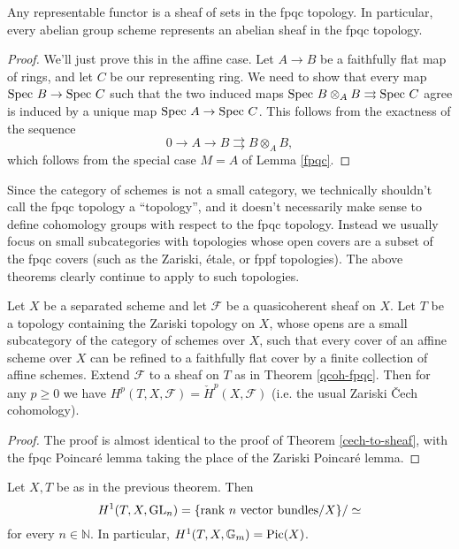 \begin{thm}\label{qcoh-fpqc} Any representable functor is a sheaf of sets in the fpqc topology. In particular, every abelian group scheme represents an abelian sheaf in the fpqc topology.
\end{thm}
\begin{proof} We'll just prove this in the affine case. Let $A\rightarrow B$ be a faithfully flat map of rings, and let $C$ be our representing ring. We need to show that every map $\mbox{\rm Spec }B\rightarrow \mbox{\rm Spec }C$ such that the two induced maps $\mbox{\rm Spec }B\otimes_AB \rightrightarrows\mbox{\rm Spec }C$ agree is induced by a unique map $\mbox{\rm Spec }A\rightarrow\mbox{\rm Spec }C$. This follows from the exactness of the sequence
\[
0 \rightarrow A \rightarrow B \rightrightarrows B\otimes_AB,
\]
which follows from the special case $M=A$ of Lemma \ref{fpqc}.
\end{proof}

\begin{rem} Since the category of schemes is not a small category, we technically shouldn't call the fpqc topology a ``topology'', and it doesn't necessarily make sense to define cohomology groups with respect to the fpqc topology. Instead we usually focus on small subcategories with topologies whose open covers are a subset of the fpqc covers (such as the Zariski, \'{e}tale, or fppf topologies). The above theorems clearly continue to apply to such topologies.
\end{rem}

\begin{thm} Let $X$ be a separated scheme and let $\mathcal{F}$ be a quasicoherent sheaf on $X$. Let $T$ be a topology containing the Zariski topology on $X$, whose opens are a small subcategory of the category of schemes over $X$, such that every cover of an affine scheme over $X$ can be refined to a faithfully flat cover by a finite collection of affine schemes. Extend $\mathcal{F}$ to a sheaf on $T$ as in Theorem \ref{qcoh-fpqc}. Then for any $p \ge 0$ we have $H^p(T,X,\mathcal{F}) = \check{H}^p(X,\mathcal{F})$ (i.e. the usual Zariski \v{C}ech cohomology).
\end{thm}
\begin{proof} The proof is almost identical to the proof of Theorem \ref{cech-to-sheaf}, with the fpqc Poincar\'{e} lemma taking the place of the Zariski Poincar\'{e} lemma.
\end{proof}

\begin{thm} Let $X,T$ be as in the previous theorem. Then
\[
H^1(T,X,\mbox{\rm GL}_n) = \{\mbox{\rm rank }n\mbox{\rm{ vector bundles}}/X\}/\simeq
\]
for every $n\in \mathbb{N}$. In particular, $H^1(T,X,\mathbb{G}_m) = \mbox{\rm Pic}(X)$.
\end{thm}

%
%

%

